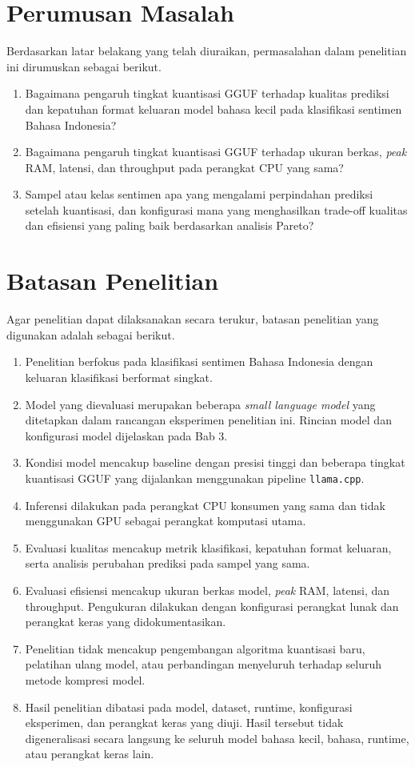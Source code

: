 \section{Perumusan Masalah}

Berdasarkan latar belakang yang telah diuraikan, permasalahan dalam penelitian ini dirumuskan sebagai berikut.

\begin{enumerate}
  \item Bagaimana pengaruh tingkat kuantisasi GGUF terhadap kualitas prediksi dan kepatuhan format keluaran model bahasa kecil pada klasifikasi sentimen Bahasa Indonesia?
  \item Bagaimana pengaruh tingkat kuantisasi GGUF terhadap ukuran berkas, \textit{peak} RAM, latensi, dan throughput pada perangkat CPU yang sama?
  \item Sampel atau kelas sentimen apa yang mengalami perpindahan prediksi setelah kuantisasi, dan konfigurasi mana yang menghasilkan trade-off kualitas dan efisiensi yang paling baik berdasarkan analisis Pareto?
\end{enumerate}

\section{Batasan Penelitian}

Agar penelitian dapat dilaksanakan secara terukur, batasan penelitian yang digunakan adalah sebagai berikut.

\begin{enumerate}
  \item Penelitian berfokus pada klasifikasi sentimen Bahasa Indonesia dengan keluaran klasifikasi berformat singkat.
  \item Model yang dievaluasi merupakan beberapa \textit{small language model} yang ditetapkan dalam rancangan eksperimen penelitian ini. Rincian model dan konfigurasi model dijelaskan pada Bab 3.
  \item Kondisi model mencakup baseline dengan presisi tinggi dan beberapa tingkat kuantisasi GGUF yang dijalankan menggunakan pipeline \texttt{llama.cpp}.
  \item Inferensi dilakukan pada perangkat CPU konsumen yang sama dan tidak menggunakan GPU sebagai perangkat komputasi utama.
  \item Evaluasi kualitas mencakup metrik klasifikasi, kepatuhan format keluaran, serta analisis perubahan prediksi pada sampel yang sama.
  \item Evaluasi efisiensi mencakup ukuran berkas model, \textit{peak} RAM, latensi, dan throughput. Pengukuran dilakukan dengan konfigurasi perangkat lunak dan perangkat keras yang didokumentasikan.
  \item Penelitian tidak mencakup pengembangan algoritma kuantisasi baru, pelatihan ulang model, atau perbandingan menyeluruh terhadap seluruh metode kompresi model.
  \item Hasil penelitian dibatasi pada model, dataset, runtime, konfigurasi eksperimen, dan perangkat keras yang diuji. Hasil tersebut tidak digeneralisasi secara langsung ke seluruh model bahasa kecil, bahasa, runtime, atau perangkat keras lain.
\end{enumerate}

